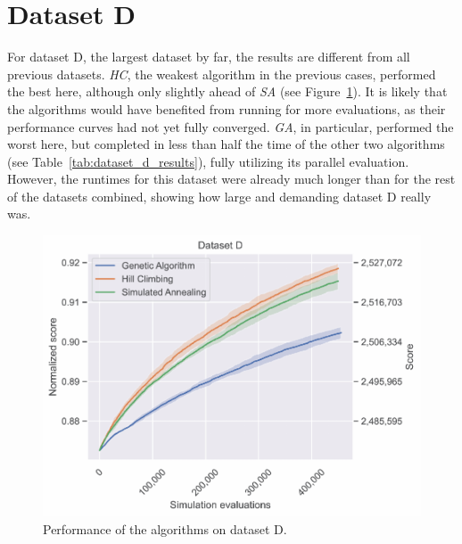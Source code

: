 \newpage
\section{Dataset D} \label{sec:dataset_d}

For dataset D, the largest dataset by far, the results are different from all previous datasets. \textit{HC}, the weakest algorithm in the previous cases, performed the best here, although only slightly ahead of \textit{SA} (see Figure~\ref{fig:dataset_d_experiment}). It is likely that the algorithms would have benefited from running for more evaluations, as their performance curves had not yet fully converged.
\textit{GA}, in particular, performed the worst here, but completed in less than half the time of the other two algorithms (see Table~\ref{tab:dataset_d_results}), fully utilizing its parallel evaluation.
However, the runtimes for this dataset were already much longer than for the rest of the datasets combined, showing how large and demanding dataset D really was.

\bigskip

\begin{figure}[h]
    \centering
    \includegraphics[width=\linewidth]{img/experiments/pdfa-d_Genetic_Algorithm_Hill_Climbing_Simulated_Annealing.pdf}
    \caption[Performance of the algorithms on dataset D]{
        Performance of the algorithms on dataset D.
    }
    \label{fig:dataset_d_experiment}
\end{figure}

